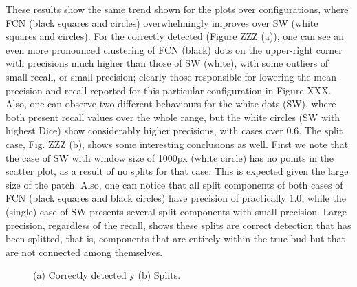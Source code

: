 \documentclass[a4paper,authoryear,review]{elsarticle}
\begin{document}
These results show the same trend shown for the plots over configurations, where FCN (black squares and circles) overwhelmingly improves over SW (white squares and circles). For the correctly detected (Figure ZZZ (a)),  one can see an even more pronounced clustering of FCN (black) dots on the upper-right corner with precisions much higher than those of SW (white), with some outliers of small recall, or small precision; clearly those responsible for lowering the mean precision and recall reported for this particular configuration in Figure XXX. Also, one can observe two different behaviours for the white dots (SW), where both present recall values over the whole range, but the white circles (SW with highest Dice) show considerably higher precisions, with cases over $0.6$.  
The split case, Fig. ZZZ (b),  shows some interesting conclusions as well. First we note that the case of SW with window size of 1000px (white circle) has no points in the scatter plot, as a result of no splits for that case. This is expected given the large size of the patch. Also, one can notice that all split components of both cases of FCN (black squares and black circles)  have precision of practically $1.0$, while the (single) case of SW presents several split components with small precision. Large precision, regardless of the recall, shows these splits are correct detection that has been splitted, that is, components that are entirely within the true bud but that are not connected among themselves. 

\begin{figure}%
	\centering
	\label{fig:precision-recall-a}
	\qquad
	\label{fig:precision-recall-b}
	\caption{ (a) Correctly detected y (b) Splits.}%
	\label{fig:precision-recall}%
\end{figure}
\end{document}

